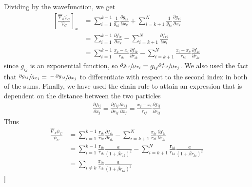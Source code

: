 \documentclass[twocolumns, a4paper,10pt,fleqn]{extarticle}
\newcommand{\eq}[1]{{\small\begin{align*}#1\end{align*}}}
\renewcommand\vec[1]{\boldsymbol{\mathbf{#1}}}
\newcommand{\op}[1]{\hat{#1}}
\begin{document}
{Dividing by the wavefunction, we get
\eq{
  \left[\frac{\op\nabla_k\psi_C}{\psi_C}\right]_x
  &=\sum_{i=1}^{k-1}\frac{1}{g_{ik}}\frac{\partial g_{ik}}{\partial x_k}  
  + \sum_{i=k+1}^{N}\frac{1}{g_{ki}}\frac{\partial g_{ki}}{\partial x_k} \\
  &=\sum_{i=1}^{k-1}\frac{\partial f_{ik}}{\partial x_k}  
  - \sum_{i=k+1}^{N}\frac{\partial f_{ki}}{\partial x_i}\\
  &=\sum_{i=1}^{k-1}\frac{x_k-x_i}{r_{ik}}\frac{\partial f_{ik}}{\partial r_{ik}}  
  - \sum_{i=k+1}^{N}\frac{x_i-x_k}{r_{ki}}\frac{\partial f_{ki}}{\partial r_{ki}}
}
since $g_{ij}$ is an exponential function, so
$\sfrac{\partial g_{ij}}{\partial x_i} = g_{ij} \sfrac{\partial f_{ij}}{\partial x_j}$.
We also used the fact that $\sfrac{\partial g_{ij}}{\partial x_i} = \sfrac{-\partial g_{ij}}{\partial x_j}$ to differentiate with respect to the second index in both of the sums.
Finally, we have used the chain rule to attain an expression that is dependent
on the distance between the two particles
\eq{
  \frac{\partial f_{ij}}{\partial x_j} 
  = \frac{\partial f_{ij}}{\partial r_{ij}} \frac{\partial r_{ij}}{\partial x_j} 
  = \frac{x_j - x_i}{r_{ij}} \frac{\partial f_{ij}}{\partial r_{ij}}
}
Thus
\eq{
  \frac{\op\nabla_k\psi_C}{\psi_C} &=
    \sum_{i=1}^{k-1}\frac{\vec r_{ik}}{r_{ik}}\frac{\partial f_{ik}}{\partial r_{ik}}  
    - \sum_{i=k+1}^{N}\frac{\vec r_{ki}}{r_{ki}}\frac{\partial f_{ki}}{\partial r_{ki}}\\
    &=\sum_{i=1}^{k-1}\frac{\vec r_{ik}}{r_{ik}}\frac{a}{(1+\beta r_{ik})^2}  
    - \sum_{i=k+1}^{N}\frac{\vec r_{ki}}{r_{ki}}\frac{a}{(1+\beta r_{ki})^2}\\
    &=\sum_{i\neq k}\frac{\vec r_{ik}}{r_{ik}}\frac{a}{(1+\beta r_{ik})^2} 
}
}]
\end{document}
